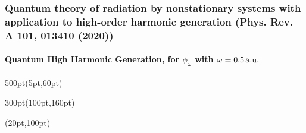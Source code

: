 \begin{frame}
\frametitle{Quantum theory of radiation by nonstationary systems 
        with application to high-order harmonic generation
        (Phys. Rev. A 101, 013410 (2020))}
        \framesubtitle{Quantum High Harmonic Generation, 
        for $\phi_\omega$ with $\omega = 0.5\,\rm a.u.$}
\small
\begin{textblock*}{500pt}(5pt,60pt)
 \begin{minipage}{0.0\linewidth}
 \begin{figure}[tp]
 \end{figure}

\end{minipage}
\end{textblock*}

\begin{textblock*}{300pt}(100pt,160pt)
\end{textblock*}


\begin{textblock*}{\linewidth}(20pt,100pt)
\end{textblock*}
%
%
%
%

\end{frame}




